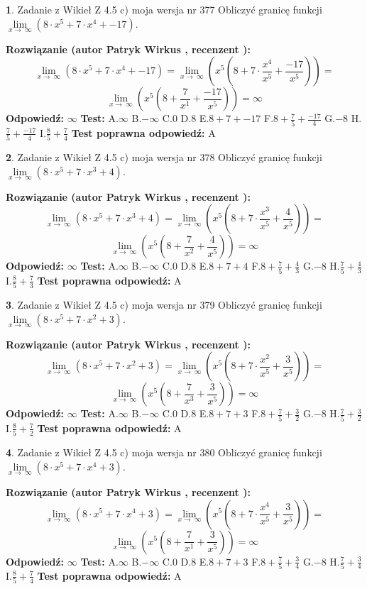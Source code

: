 \documentclass[12pt, a4paper]{article}
\theoremstyle{definition} %
\newtheorem{zad}{}
\newcommand{\zadStart}[1]{\begin{zad}#1\newline}
\newcommand{\zadStop}{\end{zad}}
\newcommand{\rozwStart}[2]{\noindent \textbf{Rozwiązanie (autor #1 , recenzent #2): }\newline}
\newcommand{\rozwStop}{\newline}
\newcommand{\odpStart}{\noindent \textbf{Odpowiedź:}\newline}
\newcommand{\odpStop}{\newline}
\newcommand{\testStart}{\noindent \textbf{Test:}\newline}
\newcommand{\testStop}{\newline}
\newcommand{\kluczStart}{\noindent \textbf{Test poprawna odpowiedź:}\newline}
\newcommand{\kluczStop}{\newline}
\begin{document}
\zadStart{Zadanie z Wikieł Z 4.5 c) moja wersja nr 377}
Obliczyć granicę funkcji  $\lim\limits_{x\to\ \infty}(8 \cdot x^{5}+7 \cdot x^{4}+-17)$.
\zadStop
\rozwStart{Patryk Wirkus}{}
$$\lim\limits_{x\to\ \infty}(8 \cdot x^{5}+7 \cdot x^{4}+-17) = \lim\limits_{x\to\ \infty}(x^{5}(8 +7 \cdot \frac{x^{4}}{x^{5}}+\frac{-17}{x^{5}})) =$$ $$\lim\limits_{x\to\ \infty}(x^{5}(8 +\frac{7}{x^{1}}+\frac{-17}{x^{5}})) =\infty$$
\rozwStop
\odpStart
$\infty$
\odpStop
\testStart
A.$\infty$ B.$-\infty$ C.$0$ D.$8$ E.$8 + 7 + -17$
F.$8+\frac{7}{5}+\frac{-17}{4}$ G.$-8$
H.$\frac{7}{5}+\frac{-17}{4}$
I.$\frac{8}{5}+\frac{7}{4}$
\testStop
\kluczStart
A
\kluczStop



\zadStart{Zadanie z Wikieł Z 4.5 c) moja wersja nr 378}
Obliczyć granicę funkcji  $\lim\limits_{x\to\ \infty}(8 \cdot x^{5}+7 \cdot x^{3}+4)$.
\zadStop
\rozwStart{Patryk Wirkus}{}
$$\lim\limits_{x\to\ \infty}(8 \cdot x^{5}+7 \cdot x^{3}+4) = \lim\limits_{x\to\ \infty}(x^{5}(8 +7 \cdot \frac{x^{3}}{x^{5}}+\frac{4}{x^{5}})) =$$ $$\lim\limits_{x\to\ \infty}(x^{5}(8 +\frac{7}{x^{2}}+\frac{4}{x^{5}})) =\infty$$
\rozwStop
\odpStart
$\infty$
\odpStop
\testStart
A.$\infty$ B.$-\infty$ C.$0$ D.$8$ E.$8 + 7 + 4$
F.$8+\frac{7}{5}+\frac{4}{3}$ G.$-8$
H.$\frac{7}{5}+\frac{4}{3}$
I.$\frac{8}{5}+\frac{7}{3}$
\testStop
\kluczStart
A
\kluczStop



\zadStart{Zadanie z Wikieł Z 4.5 c) moja wersja nr 379}
Obliczyć granicę funkcji  $\lim\limits_{x\to\ \infty}(8 \cdot x^{5}+7 \cdot x^{2}+3)$.
\zadStop
\rozwStart{Patryk Wirkus}{}
$$\lim\limits_{x\to\ \infty}(8 \cdot x^{5}+7 \cdot x^{2}+3) = \lim\limits_{x\to\ \infty}(x^{5}(8 +7 \cdot \frac{x^{2}}{x^{5}}+\frac{3}{x^{5}})) =$$ $$\lim\limits_{x\to\ \infty}(x^{5}(8 +\frac{7}{x^{3}}+\frac{3}{x^{5}})) =\infty$$
\rozwStop
\odpStart
$\infty$
\odpStop
\testStart
A.$\infty$ B.$-\infty$ C.$0$ D.$8$ E.$8 + 7 + 3$
F.$8+\frac{7}{5}+\frac{3}{2}$ G.$-8$
H.$\frac{7}{5}+\frac{3}{2}$
I.$\frac{8}{5}+\frac{7}{2}$
\testStop
\kluczStart
A
\kluczStop



\zadStart{Zadanie z Wikieł Z 4.5 c) moja wersja nr 380}
Obliczyć granicę funkcji  $\lim\limits_{x\to\ \infty}(8 \cdot x^{5}+7 \cdot x^{4}+3)$.
\zadStop
\rozwStart{Patryk Wirkus}{}
$$\lim\limits_{x\to\ \infty}(8 \cdot x^{5}+7 \cdot x^{4}+3) = \lim\limits_{x\to\ \infty}(x^{5}(8 +7 \cdot \frac{x^{4}}{x^{5}}+\frac{3}{x^{5}})) =$$ $$\lim\limits_{x\to\ \infty}(x^{5}(8 +\frac{7}{x^{1}}+\frac{3}{x^{5}})) =\infty$$
\rozwStop
\odpStart
$\infty$
\odpStop
\testStart
A.$\infty$ B.$-\infty$ C.$0$ D.$8$ E.$8 + 7 + 3$
F.$8+\frac{7}{5}+\frac{3}{4}$ G.$-8$
H.$\frac{7}{5}+\frac{3}{4}$
I.$\frac{8}{5}+\frac{7}{4}$
\testStop
\kluczStart
A
\kluczStop
\end{document}

